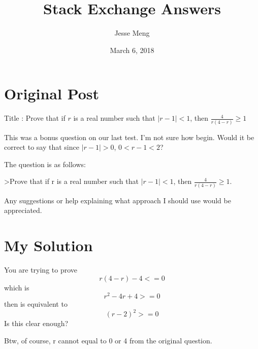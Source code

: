 \documentclass{article}
\title{Stack Exchange Answers}
\author{Jesse Meng }
\date{March 6, 2018}
\begin{document}
\maketitle

\section{Original Post}
Title : Prove that if $r$ is a real number such that $|r-1|<1$, then $\frac4{r(4-r)}\ge1$

This was a bonus question on our last test. I'm not sure how begin. Would it be correct to say that since $|r-1|>0$, $0<r-1<2$? 

The question is as follows:

>Prove that if r is a real number such that $|r-1|<1$, then $\frac4{r(4-r)}\ge1$.

Any suggestions or help explaining what approach I should use would be appreciated.
\section{My Solution}
You are trying to prove $$r(4-r)-4<=0$$ which is $$r^2-4r+4>=0$$ then is equivalent to $${(r-2)}^2>=0$$ Is this clear enough?

Btw, of course, r cannot equal to 0 or 4 from the original question.
\end{document}

